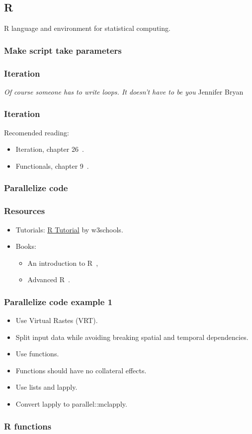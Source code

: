 \subsection{R}

\begin{frame}
	R language and environment for statistical computing.
\end{frame}

\begin{frame}
	\frametitle{Make script take parameters}
\end{frame}

\begin{frame}
	\frametitle{Iteration}
	\textit{Of course someone has to write loops. It doesn't have to be
		you}
	Jennifer Bryan
\end{frame}

\begin{frame}
	\frametitle{Iteration}
	Recomended reading:
	\begin{itemize}
		\item Iteration, chapter 26~\cite{wickham2023a}.
		\item Functionals, chapter 9~\cite{wickham2019}.
	\end{itemize}
\end{frame}

\begin{frame}
	\frametitle{Parallelize code}
\end{frame}

\begin{frame}
	\frametitle{Resources}
	\begin{itemize}
		\item Tutorials: \href{https://www.w3schools.com/r/default.asp}
		      {R Tutorial} by w3schools.
		\item Books:
		      \begin{itemize}
			      \item An introduction to R~\cite{venables2024},
			      \item Advanced R~\cite{wickham2015a}.
		      \end{itemize}
	\end{itemize}
\end{frame}

\begin{frame}
	\frametitle{Parallelize code example 1}
	\begin{itemize}
		\item Use Virtual Rastes (VRT).
		\item Split input data while avoiding breaking spatial and
		      temporal dependencies.
		\item Use functions.
		\item Functions should have no collateral effects.
		\item Use lists and lapply.
		\item Convert lapply to parallel::mclapply.
	\end{itemize}
\end{frame}

\begin{frame}
	\frametitle{R functions}
\end{frame}
